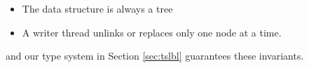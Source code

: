 \begin{itemize}
\item The data structure is always a tree
\item A writer thread unlinks or replaces only one node at a time. 
\end{itemize}
and our type system in Section \ref{sec:tslbl} guarantees these invariants.




